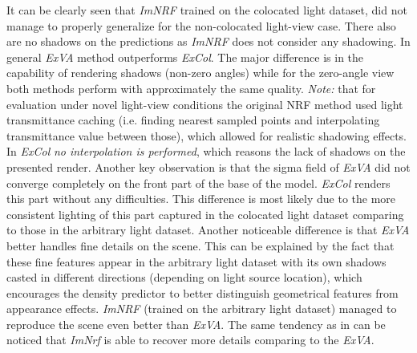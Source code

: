 It can be clearly seen that \textit{ImNRF} trained on the colocated light dataset,
did not manage to properly generalize for the non-colocated light-view case.
There also are no shadows on the predictions as \textit{ImNRF} does not consider any shadowing.
In general \textit{ExVA} method outperforms \textit{ExCol}.
The major difference is in the capability of rendering shadows (non-zero angles)
while for the zero-angle view both methods perform with approximately the same quality.
\textit{Note:} that for evaluation under novel light-view conditions the original NRF method used light transmittance caching
(i.e. finding nearest sampled points and interpolating transmittance value between those),
which allowed for realistic shadowing effects.
In \textit{ExCol} \textit{no interpolation is performed}, which reasons the lack of shadows on the presented render.
Another key observation is that the sigma field of \textit{ExVA} did not converge completely on the front part of the base of the model.
\textit{ExCol} renders this part without any difficulties.
This difference is most likely due to the more consistent lighting of this part
captured in the colocated light dataset comparing to those in the arbitrary light dataset.
Another noticeable difference is that \textit{ExVA} better handles fine details on the scene.
This can be explained by the fact that these fine features appear
in the arbitrary light dataset with its own shadows casted in different directions (depending on light source location),
which encourages the density predictor to better distinguish geometrical features from appearance effects.
\textit{ImNRF} (trained on the arbitrary light dataset)
managed to reproduce the scene even better than \textit{ExVA}.
The same tendency as in  can be noticed
that \textit{ImNrf} is able to recover more details comparing to the \textit{ExVA}.





% 




